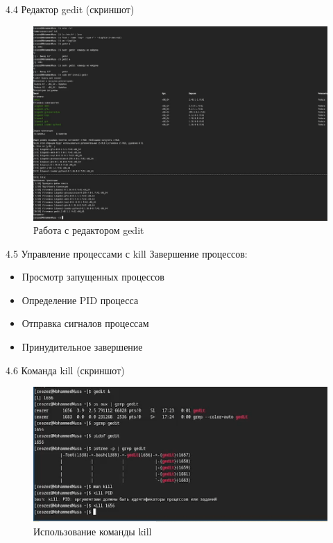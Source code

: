 \documentclass[
  ignorenonframetext,
  aspectratio=169,
  russian,
]{beamer}
\providecommand{\tightlist}{%
  \setlength{\itemsep}{0pt}\setlength{\parskip}{0pt}}
\begin{document}
\begin{frame}{4.4 Редактор gedit (скриншот)}
\label{ux440ux435ux434ux430ux43aux442ux43eux440-gedit-ux441ux43aux440ux438ux43dux448ux43eux442}
\begin{figure}[H]

{\centering \includegraphics[width=0.8\linewidth,height=\textheight,keepaspectratio]{image/gedit.png}

}

\caption{Работа с редактором gedit}

\end{figure}%
\end{frame}

\begin{frame}{4.5 Управление процессами с kill}
\label{ux443ux43fux440ux430ux432ux43bux435ux43dux438ux435-ux43fux440ux43eux446ux435ux441ux441ux430ux43cux438-ux441-kill}
Завершение процессов:

\begin{itemize}[<+->]
\tightlist
\item
  Просмотр запущенных процессов
\item
  Определение PID процесса
\item
  Отправка сигналов процессам
\item
  Принудительное завершение
\end{itemize}
\end{frame}

\begin{frame}{4.6 Команда kill (скриншот)}
\label{ux43aux43eux43cux430ux43dux434ux430-kill-ux441ux43aux440ux438ux43dux448ux43eux442}
\begin{figure}[H]

{\centering \includegraphics[width=0.8\linewidth,height=\textheight,keepaspectratio]{image/kill.png}

}

\caption{Использование команды kill}

\end{figure}%
\end{frame}
\end{document}
